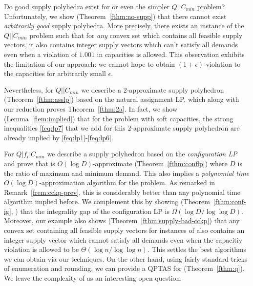 \medskip {}
Do good supply polyhedra exist for \cckp or even the simpler $Q||C_{min} $ problem? Unfortunately, we show (Theorem~\ref{fthm:no-supp}) that there cannot exist {\em arbitrarily good} supply polyhedra. More precisely, there exists an instance of the $Q||C_{min}$ problem such that
for {\em any} convex set which contains all feasible supply vectors, it also contains integer supply vectors which can't satisfy all demands even when a violation of $1.001$ in capacities  is allowed. This observation exhibits the limitation of our approach: we cannot hope to obtain $(1+\epsilon)$-violation to the capacities for arbitrarily small $\epsilon$.

Nevertheless, for $Q||C_{min}$ we describe a $2$-approximate supply polyhedron (Theorem~\ref{fthm:asslp}) based on the natural assignment LP, which along with our reduction proves Theorem~\ref{fthm:2a}. In fact, we show (Lemma~\ref{flem:implied}) that for the \mckc problem with soft capacities, the strong  inequalities \eqref{feq:lp7} that we add for this $2$-approximate supply polyhedron are already implied by \eqref{feq:lp1}-\eqref{feq:lp6}.

For $Q|f_i|C_{min}$ we describe a supply polyhedron based on the {\em configuration LP} and prove that is $O(\log D)$-approximate (Theorem~\ref{fthm:conflp}) where $D$ is the ratio of maximum and minimum demand. This also implies a {\em polynomial time} $O(\log D)$-approximation algorithm for the \cckp problem. As remarked in Remark~\ref{frem:cckp-prev}, this is considerably better than any polynomial time algorithm implied before. %
We complement this by showing (Theorem~\ref{fthm:conf-ig}, ) that the integrality gap of the configuration LP is $\Omega(\log D/\log\log D)$.
Moreover, our example also shows (Theorem~\ref{fthm:supply-bad-cckp}) that any convex set containing all feasible supply vectors for instances of \cckp also contains an integer supply vector which cannot satisfy all demands even when the 
capacitiy violation is allowed to be $\Theta(\log n/\log\log n)$. This settles the best algorithms we can obtain via our techniques.
On the other hand, using fairly standard tricks of enumeration and rounding, we can provide a QPTAS for \cckp (Theorem~\ref{fthm:q}). We leave the complexity of \cckp as an interesting open question.


